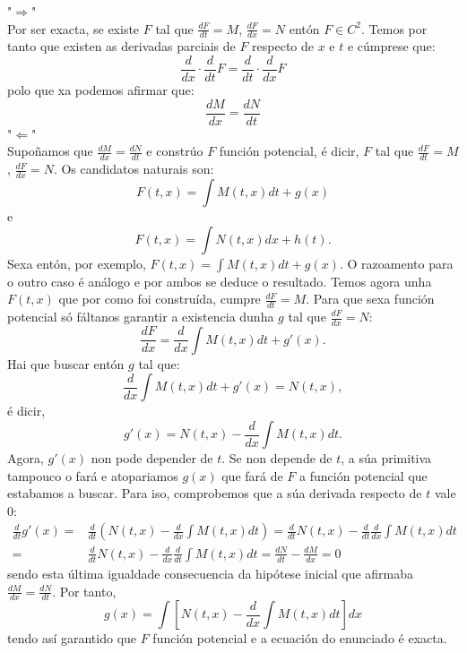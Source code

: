 \documentclass[11pt, a4paper,twoside]{article}
\makeatletter
\theoremstyle{theorem-style}  %
\renewenvironment{proof}[1][\proofname]{\par
	\pushQED{\qed}%
	\normalfont \topsep6\p@\@plus6\p@\relax
	\list{}{%
		\settowidth{\leftmargin}{\quad:\hskip\labelsep}%
		\setlength{\labelwidth}{0pt}%
		\setlength{\itemindent}{-\leftmargin}%
	}%
	\item[\hskip\labelsep\itshape#1\@addpunct{:}]\ignorespaces
}{%
	\popQED\endlist\@endpefalse
}
\theoremstyle{definition-style}
\theoremstyle{example-style}
\makeatother
\begin{document}
\begin{proof}
	"$\Rightarrow$" \\
	Por ser exacta, se existe $F$ tal que $\frac{dF}{dt} = M$, $\frac{dF}{dx} = N$ entón $F \in C^2$. Temos por tanto que existen as derivadas parciais de $F$ respecto de $x$ e $t$ e cúmprese que:
	\[ \frac{d}{dx} \cdot \frac{d}{dt} F = \frac{d}{dt} \cdot \frac{d}{dx} F\]
	polo que xa podemos afirmar que:
	\[\frac{dM}{dx} = \frac{dN}{dt}\]
	"$\Leftarrow$" \\
	Supoñamos que $\frac{dM}{dx} = \frac{dN}{dt}$  e constrúo $F$ función potencial, é dicir, $F$ tal que $\frac{dF}{dt} = M$, $\frac{dF}{dx} = N$. Os candidatos naturais son:
	\[F(t,x)=\int M(t, x)dt + g(x)\]
	e
	\[F(t,x)=\int N(t, x)dx + h(t).\]
	Sexa entón, por exemplo, $F(t, x) = \int M(t, x)dt + g(x)$. O razoamento para o outro caso é análogo e por ambos se deduce o resultado. Temos agora unha $ F(t,x) $ que por como foi construída, cumpre $\frac{dF}{dt} = M$. Para que sexa función potencial só fáltanos garantir a existencia dunha $g$ tal que $\frac{dF}{dx} = N$:
	\[\frac{dF}{dx} = \frac{d}{dx}\int M(t, x)dt + g'(x).\]
	Hai que buscar entón $g$ tal que:
	\[\frac{d}{dx}\int M(t, x)dt + g'(x) = N(t, x),\]
	é dicir, 
	\[g'(x) = N(t, x) - \frac{d}{dx}\int M(t, x)dt.\]
	Agora, $ g'(x) $ non pode depender de $ t $. Se non depende de $ t $, a súa primitiva tampouco o fará e atopariamos $g(x)  $ que fará de $ F $ a función potencial que estabamos a buscar. Para iso, comprobemos que a súa derivada respecto de $ t $ vale 0:
	\begin{align*}
	\frac{d}{dt} g'(x)=	& \frac{d}{dt}\left( N(t, x) - \frac{d}{dx}\int M(t, x)dt\right)  =  \frac{d}{dt}N(t, x) -  \frac{d}{dt}\frac{d}{dx}\int M(t, x)dt  \\
		=& \frac{d}{dt}N(t, x) -  \frac{d}{dx}\frac{d}{dt}\int M(t, x)dt = 
		\frac{dN}{dt} - \frac{dM}{dx} = 0
	\end{align*}
	sendo esta última igualdade consecuencia da hipótese inicial que afirmaba $\frac{dM}{dx} = \frac{dN}{dt}$. Por tanto, 
	\[g(x) = \int\left[ N(t, x) - \frac{d}{dx}\int M(t, x)dt\right] dx\]
	tendo así garantido que $F$ función potencial e a ecuación do enunciado é exacta.
\end{proof}
\end{document}
